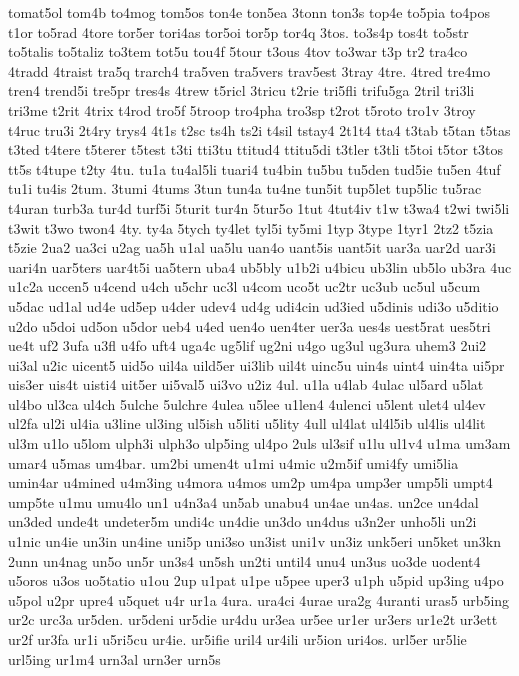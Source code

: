 {tomat5ol
tom4b
to4mog
tom5os
ton4e
ton5ea
3tonn
ton3s
top4e
to5pia
to4pos
t1or
to5rad
4tore
tor5er
tori4as
tor5oi
tor5p
tor4q
3tos.
to3s4p
tos4t
to5str
to5talis
to5taliz
to3tem
tot5u
tou4f
5tour
t3ous
4tov
to3war
t3p
tr2
tra4co
4tradd
4traist
tra5q
trarch4
tra5ven
tra5vers
trav5est
3tray
4tre.
4tred
tre4mo
tren4
trend5i
tre5pr
tres4s
4trew
t5ricl
3tricu
t2rie
tri5fli
trifu5ga
2tril
tri3li
tri3me
t2rit
4trix
t4rod
tro5f
5troop
tro4pha
tro3sp
t2rot
t5roto
tro1v
3troy
t4ruc
tru3i
2t4ry
trys4
4t1s
t2sc
ts4h
ts2i
t4sil
tstay4
2t1t4
tta4
t3tab
t5tan
t5tas
t3ted
t4tere
t5terer
t5test
t3ti
tti3tu
ttitud4
ttitu5di
t3tler
t3tli
t5toi
t5tor
t3tos
tt5s
t4tupe
t2ty
4tu.
tu1a
tu4al5li
tuari4
tu4bin
tu5bu
tu5den
tud5ie
tu5en
4tuf
tu1i
tu4is
2tum.
3tumi
4tums
3tun
tun4a
tu4ne
tun5it
tup5let
tup5lic
tu5rac
t4uran
turb3a
tur4d
turf5i
5turit
tur4n
5tur5o
1tut
4tut4iv
t1w
t3wa4
t2wi
twi5li
t3wit
t3wo
twon4
4ty.
ty4a
5tych
ty4let
tyl5i
ty5mi
1typ
3type
1tyr1
2tz2
t5zia
t5zie
2ua2
ua3ci
u2ag
ua5h
u1al
ua5lu
uan4o
uant5is
uant5it
uar3a
uar2d
uar3i
uari4n
uar5ters
uar4t5i
ua5tern
uba4
ub5bly
u1b2i
u4bicu
ub3lin
ub5lo
ub3ra
4uc
u1c2a
uccen5
u4cend
u4ch
u5chr
uc3l
u4com
uco5t
uc2tr
uc3ub
uc5ul
u5cum
u5dac
ud1al
ud4e
ud5ep
u4der
udev4
ud4g
udi4cin
ud3ied
u5dinis
udi3o
u5ditio
u2do
u5doi
ud5on
u5dor
ueb4
u4ed
uen4o
uen4ter
uer3a
ues4s
uest5rat
ues5tri
ue4t
uf2
3ufa
u3fl
u4fo
uft4
uga4c
ug5lif
ug2ni
u4go
ug3ul
ug3ura
uhem3
2ui2
ui3al
u2ic
uicent5
uid5o
uil4a
uild5er
ui3lib
uil4t
uinc5u
uin4s
uint4
uin4ta
ui5pr
uis3er
uis4t
uisti4
uit5er
ui5val5
ui3vo
u2iz
4ul.
u1la
u4lab
4ulac
ul5ard
u5lat
ul4bo
ul3ca
ul4ch
5ulche
5ulchre
4ulea
u5lee
u1len4
4ulenci
u5lent
ulet4
ul4ev
ul2fa
ul2i
ul4ia
u3line
ul3ing
ul5ish
u5liti
u5lity
4ull
ul4lat
ul4l5ib
ul4lis
ul4lit
ul3m
u1lo
u5lom
ulph3i
ulph3o
ulp5ing
ul4po
2uls
ul3sif
u1lu
ul1v4
u1ma
um3am
umar4
u5mas
um4bar.
um2bi
umen4t
u1mi
u4mic
u2m5if
umi4fy
umi5lia
umin4ar
u4mined
u4m3ing
u4mora
u4mos
um2p
um4pa
ump3er
ump5li
umpt4
ump5te
u1mu
umu4lo
un1
u4n3a4
un5ab
unabu4
un4ae
un4as.
un2ce
un4dal
un3ded
unde4t
undeter5m
undi4c
un4die
un3do
un4dus
u3n2er
unho5li
un2i
u1nic
un4ie
un3in
un4ine
uni5p
uni3so
un3ist
uni1v
un3iz
unk5eri
un5ket
un3kn
2unn
un4nag
un5o
un5r
un3s4
un5sh
un2ti
until4
unu4
un3us
uo3de
uodent4
u5oros
u3os
uo5tatio
u1ou
2up
u1pat
u1pe
u5pee
uper3
u1ph
u5pid
up3ing
u4po
u5pol
u2pr
upre4
u5quet
u4r
ur1a
4ura.
ura4ci
4urae
ura2g
4uranti
uras5
urb5ing
ur2c
urc3a
ur5den.
ur5deni
ur5die
ur4du
ur3ea
ur5ee
ur1er
ur3ers
ur1e2t
ur3ett
ur2f
ur3fa
ur1i
u5ri5cu
ur4ie.
ur5ifie
uril4
ur4ili
ur5ion
uri4os.
url5er
ur5lie
url5ing
ur1m4
urn3al
urn3er
urn5s
}
